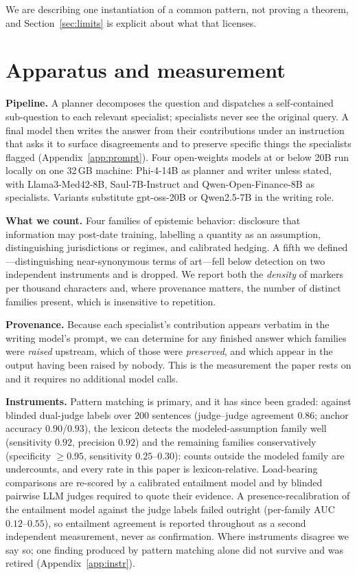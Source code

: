 \documentclass[11pt]{article}
\begin{document}
We are describing one instantiation of a common pattern, not proving a
theorem, and Section~\ref{sec:limits} is explicit about what that licenses.

\section{Apparatus and measurement}
\textbf{Pipeline.} A planner decomposes the question and dispatches a
self-contained sub-question to each relevant specialist; specialists never see
the original query. A final model then writes the answer from their
contributions under an instruction that asks it to surface disagreements and
to preserve specific things the specialists flagged (Appendix~\ref{app:prompt}).
Four open-weights models at or below 20B run locally on one 32\,GB machine:
Phi-4-14B as planner and writer unless stated, with Llama3-Med42-8B,
Saul-7B-Instruct and Qwen-Open-Finance-8B as specialists. Variants substitute
gpt-oss-20B or Qwen2.5-7B in the writing role.

\textbf{What we count.} Four families of epistemic behavior: disclosure that
information may post-date training, labelling a quantity as an assumption,
distinguishing jurisdictions or regimes, and calibrated hedging. A fifth we
defined---distinguishing near-synonymous terms of art---fell below detection on
two independent instruments and is dropped. We report both the \emph{density}
of markers per thousand characters and, where provenance matters, the number of
distinct families present, which is insensitive to repetition.

\textbf{Provenance.} Because each specialist's contribution appears verbatim in
the writing model's prompt, we can determine for any finished answer which
families were \emph{raised} upstream, which of those were \emph{preserved},
and which appear in the output having been raised by nobody. This is the
measurement the paper rests on and it requires no additional model calls.

\textbf{Instruments.} Pattern matching is primary, and it has since been
graded: against blinded dual-judge labels over $200$ sentences (judge--judge
agreement $0.86$; anchor accuracy $0.90$/$0.93$), the lexicon detects the
modeled-assumption family well (sensitivity $0.92$, precision $0.92$) and the
remaining families conservatively (specificity $\geq 0.95$, sensitivity
$0.25$--$0.30$): counts outside the modeled family are undercounts, and every
rate in this paper is lexicon-relative. Load-bearing comparisons are
re-scored by a calibrated entailment model and by blinded pairwise LLM judges
required to quote their evidence. A presence-recalibration of the entailment
model against the judge labels failed outright (per-family AUC
$0.12$--$0.55$), so entailment agreement is reported throughout as a second
independent measurement, never as confirmation. Where instruments disagree we
say so; one finding produced by pattern matching alone did not survive and
was retired (Appendix~\ref{app:instr}).
\end{document}
